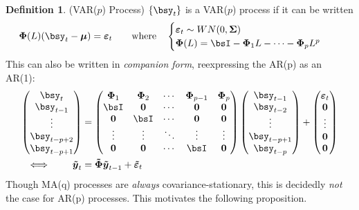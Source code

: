 \documentclass[12pt]{article}
\theoremstyle{plain}
\theoremstyle{definition}
\newtheorem{defn}[thm]{Definition}
\theoremstyle{remark}
\newcommand{\bsmu}{\boldsymbol{\mu}}
\newcommand{\bsSigma}{\boldsymbol{\Sigma}}
\newcommand{\bsvarepsilon}{\boldsymbol{\varepsilon}}
\newcommand{\bsPhi}{\boldsymbol{\Phi}}
\newcommand{\bstildePhi}{\boldsymbol{\tilde{\Phi}}}
\newcommand{\bstildey}{\boldsymbol{\tilde{y}}}
\newcommand{\bstildevarepsilon}{\boldsymbol{\tilde{\varepsilon}}}
\renewcommand{\bso}{\boldsymbol{0}}
\begin{document}
\clearpage
\begin{defn}(VAR($p$) Process)
$\{\bsy_t\}$ is a VAR($p$) process if it can be written
\begin{align*}
  \bsPhi(L)(\bsy_t-\bsmu) &= \bsvarepsilon_t
  \qquad\text{where}\quad
  \begin{cases}
    \bsvarepsilon_t\sim WN(0,\bsSigma) \\
    \bsPhi(L) = \bsI - \bsPhi_1 L - \cdots - \bsPhi_pL^p
  \end{cases}
\end{align*}
This can also be written in \emph{companion form}, reexpressing the
AR(p) as an AR(1):
\begin{align*}
  \begin{pmatrix}
    \bsy_t \\ \bsy_{t-1}\\\vdots \\ \bsy_{t-p+2}\\\bsy_{t-p+1}
  \end{pmatrix}
  &=
  \begin{pmatrix}
    \bsPhi_1 & \bsPhi_2 & \cdots& \bsPhi_{p-1} & \bsPhi_p \\
    \bsI & \bso & \cdots & \bso & \bso\\
    \bso & \bsI & \cdots & \bso & \bso\\
    \vdots & \vdots & \ddots & \vdots & \vdots \\
    \bso & \bso & \cdots & \bsI & \bso\\
  \end{pmatrix}
  \begin{pmatrix}
    \bsy_{t-1} \\ \bsy_{t-2}\\\vdots \\ \bsy_{t-p+1} \\\bsy_{t-p}
  \end{pmatrix}
  +
  \begin{pmatrix}
     \bsvarepsilon_t\\ \bso\\\vdots \\ \bso \\\bso
  \end{pmatrix}
   \\
  \iff \qquad
  \bstildey_t
  &= \bstildePhi \bstildey_{t-1} + \bstildevarepsilon_t
\end{align*}
Though MA(q) processes are \emph{always} covariance-stationary, this is
decidedly \emph{not} the case for AR(p) processes. This motivates the
following proposition.
\end{defn}
\end{document}
